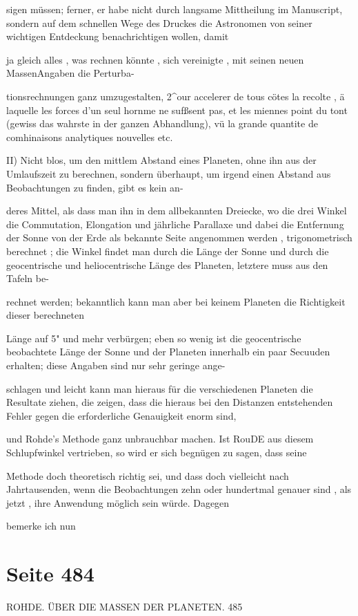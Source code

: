 \documentclass[10pt,a4paper]{article}
\begin{document}
sigen müssen; ferner, er habe nicht durch langsame Mittheilung im Manuscript, sondern auf dem schnellen Wege des Druckes die Astronomen von seiner wichtigen Entdeckung benachrichtigen wollen, damit

ja gleich alles , was rechnen könnte , sich vereinigte , mit seinen neuen MassenAngaben die Perturba-

tionsrechnungen ganz umzugestalten, 2\textasciicircum{}our accelerer de tous cötes la recolte , ä laquelle les forces d'un seul hornme ne sufßsent pas, et les miennes point du tont (gewiss das wahrste in der ganzen Abhandlung), vü la grande quantite de comhinaisons analytiques nouvelles etc.

II) Nicht blos, um den mittlem Abstand eines Planeten, ohne ihn aus der Umlaufszeit zu berechnen, sondern überhaupt, um irgend einen Abstand aus Beobachtungen zu finden, gibt es kein an-

deres Mittel, als dass man ihn in dem allbekannten Dreiecke, wo die drei Winkel die Commutation, Elongation und jährliche Parallaxe und dabei die Entfernung der Sonne von der Erde als bekannte Seite angenommen werden , trigonometrisch berechnet ; die Winkel findet man durch die Länge der Sonne und durch die geocentrische und heliocentrische Länge des Planeten, letztere muss aus den Tafeln be-

rechnet werden; bekanntlich kann man aber bei keinem Planeten die Richtigkeit dieser berechneten

Länge auf 5" und mehr verbürgen; eben so wenig ist die geocentrische beobachtete Länge der Sonne und der Planeten innerhalb ein paar Secuuden erhalten; diese Angaben sind nur sehr geringe ange-

schlagen und leicht kann man hieraus für die verschiedenen Planeten die Resultate ziehen, die zeigen, dass die hieraus bei den Distanzen entstehenden Fehler gegen die erforderliche Genauigkeit enorm sind,

und Rohde's Methode ganz unbrauchbar machen. Ist RouDE aus diesem Schlupfwinkel vertrieben, so wird er sich begnügen zu sagen, dass seine

Methode doch theoretisch richtig sei, und dass doch vielleicht nach Jahrtausenden, wenn die Beobachtungen zehn oder hundertmal genauer sind , als jetzt , ihre Anwendung möglich sein würde. Dagegen

bemerke ich nun


\newpage
\section*{Seite 484}
ROHDE. ÜBER DIE MASSEN DER PLANETEN. 485
\end{document}
